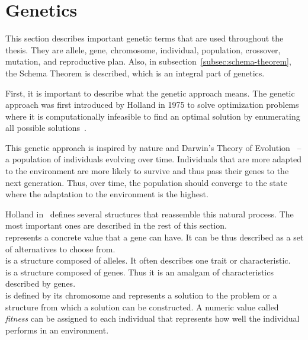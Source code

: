 \section{Genetics}\label{sec:genetics}

This section describes important genetic terms that are used throughout the thesis.
They are allele, gene, chromosome, individual, population, crossover, mutation, and reproductive plan.
Also, in subsection~\ref{subsec:schema-theorem}, the Schema Theorem is described, which is an integral part of genetics.

First, it is important to describe what the genetic approach means.
The genetic approach was first introduced by Holland in 1975
to solve optimization problems where it is computationally infeasible to
find an optimal solution by enumerating all possible solutions~\cite{hollandAdaptationNaturalArtificial1975}.

This genetic approach is inspired by nature and Darwin’s Theory of Evolution~\cite{darwinOriginSpeciesMeans2009}
– a population of individuals evolving over time.
Individuals that are more adapted to the environment are
more likely to survive and thus pass their genes to the next generation.
Thus, over time, the population should converge to the state where the adaptation to the environment is the highest.

Holland in~\cite{hollandAdaptationNaturalArtificial1975} defines several structures that reassemble this natural process.
The most important ones are described in the rest of this section.\\

 represents a concrete value that a gene can have.
It can be thus described as a set of alternatives to choose from. \\

 is a structure composed of alleles.
It often describes one trait or characteristic. \\

 is a structure composed of genes.
Thus it is an amalgam of characteristics described by genes.\\

 is defined by its chromosome and represents a solution to the problem or a structure from which a solution can be constructed.
A numeric value called \textit{fitness} can be assigned to each individual that represents how well the individual performs in an environment. \\

